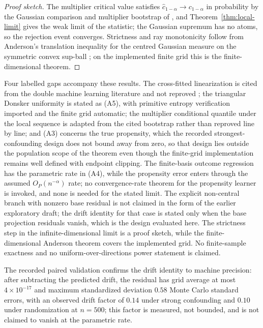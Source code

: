 \begin{proof}[Proof sketch]
The multiplier critical value satisfies $\hat c_{1-\alpha}\to c_{1-\alpha}$ in probability by the Gaussian comparison and multiplier bootstrap of \citet{cck_2013}, and Theorem~\ref{thm:local-limit} gives the weak limit of the statistic; the Gaussian supremum has no atoms, so the rejection event converges. Strictness and ray monotonicity follow from Anderson's translation inequality for the centred Gaussian measure on the symmetric convex sup-ball \citep{anderson_1955,perlman_1988}; on the implemented finite grid this is the finite-dimensional theorem.
\end{proof}

Four labelled gaps accompany these results. The cross-fitted linearization is cited from the double machine learning literature and not reproved \citep{chernozhukov_dml_2018,new_robins_2018}; the triangular Donsker uniformity is stated as (A5), with primitive entropy verification imported and the finite grid automatic; the multiplier conditional quantile under the local sequence is adapted from the cited bootstrap \citep{cck_2013} rather than reproved line by line; and (A3) concerns the true propensity, which the recorded strongest-confounding design does not bound away from zero, so that design lies outside the population scope of the theorem even though the finite-grid implementation remains well defined with endpoint clipping. The finite-basis outcome regression has the parametric rate in (A4), while the propensity error enters through the assumed $O_P(n^{-\alpha})$ rate; no convergence-rate theorem for the propensity learner is invoked, and none is needed for the stated limit. The explicit non-central branch with nonzero base residual is not claimed in the form of the earlier exploratory draft; the drift identity for that case is stated only when the base projection residuals vanish, which is the design evaluated here. The strictness step in the infinite-dimensional limit is a proof sketch, while the finite-dimensional Anderson theorem covers the implemented grid. No finite-sample exactness and no uniform-over-directions power statement is claimed.

The recorded paired validation confirms the drift identity to machine precision: after subtracting the predicted drift, the residual has grid average at most $4\times10^{-17}$ and maximum standardized deviation $0.58$ Monte Carlo standard errors, with an observed drift factor of $0.14$ under strong confounding and $0.10$ under randomization at $n=500$; this factor is measured, not bounded, and is not claimed to vanish at the parametric rate.


